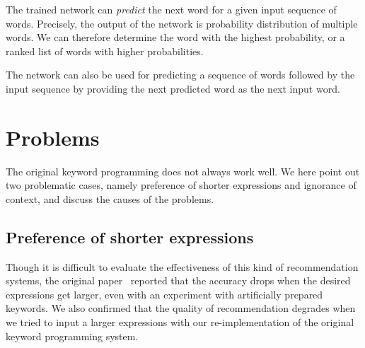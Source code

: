 \documentclass[PRO,english]{ipsj}
\begin{document}

The trained network can \emph{predict} the next word for a given input sequence of words.  Precisely, the output of the network is probability distribution of multiple words.  We can therefore determine the word with the highest probability, or a ranked list of words with higher probabilities.

The network can also be used for predicting a sequence of words followed by the input sequence by providing the next predicted word as the next input word.




\section{Problems}\label{sec:problem}

The original keyword programming does not always work well.  We here point out two problematic cases, namely preference of shorter expressions and ignorance of context, and discuss the causes of the problems.

\subsection{Preference of shorter expressions}
Though it is difficult to evaluate the effectiveness of this kind of recommendation systems, the original paper~\cite{KeywordProgramming} reported that the accuracy drops when the desired expressions get larger, even with an experiment with artificially prepared keywords.  We also confirmed that the quality of recommendation degrades when we tried to input a larger expressions with our re-implementation of the original keyword programming system.

\end{document}
